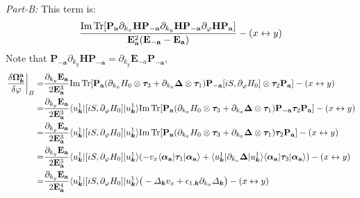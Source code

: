 \begin{subappendices}
\emph{Part-B:} This term is:
\begin{equation}
	\frac{\mbox{Im\,Tr}[\mathbf P_{\mathbf a} \partial_{k_x} \mathbf H \mathbf P_{-\mathbf a} \partial_{k_y}\mathbf H \mathbf P_{-\mathbf a}\partial_\varphi\mathbf H \mathbf P_{\mathbf a}]}{\mathbf E_{\mathbf a}^2(\mathbf E_{-\mathbf a}-\mathbf E_{\mathbf a})}-(x\leftrightarrow y)
\end{equation}
Note that $\mathbf P_{-\mathbf a} \partial_{k_y}\mathbf H \mathbf P_{-\mathbf a}=\partial_{k_y}\mathbf E_{\mathbf -a}\mathbf P_{-\mathbf a}$,
\begin{align}
	\left.\frac{\delta\boldsymbol\Omega^{\mathbf a}_{\bm{k}}}{\delta\varphi}\right|_{B}=&\frac{\partial_{k_y}\mathbf E_{\mathbf a}}{2\mathbf E_{\mathbf a}^3}\mbox{Im\,Tr}[\mathbf P_{\mathbf a} (\partial_{k_x}H_0\otimes\boldsymbol\tau_3+\partial_{k_x}\boldsymbol\Delta\otimes\boldsymbol\tau_1) \mathbf P_{-\mathbf a} [iS,\partial_\varphi H_0]\otimes\boldsymbol\tau_2 \mathbf P_{\mathbf a}]-(x\leftrightarrow y)\notag\\
	=&\frac{\partial_{k_y}\mathbf E_{\mathbf a}}{2\mathbf E_{\mathbf a}^3}\langle u^1_{\bm{k}}|[iS,\partial_\varphi H_0]|u^1_{\bm{k}}\rangle\mbox{Im\,Tr}[\mathbf P_{\mathbf a} (\partial_{k_x}H_0\otimes\boldsymbol\tau_3+\partial_{k_x}\boldsymbol\Delta\otimes\boldsymbol\tau_1) \mathbf P_{-\mathbf a}\boldsymbol\tau_2 \mathbf P_{\mathbf a}]  -(x\leftrightarrow y)\notag\\
	=&\frac{\partial_{k_y}\mathbf E_{\mathbf a}}{2\mathbf E_{\mathbf a}^3}\langle u^1_{\bm{k}}|[iS,\partial_\varphi H_0]|u^1_{\bm{k}}\rangle\mbox{Im\,Tr}[\mathbf P_{\mathbf a} (\partial_{k_x}H_0\otimes\boldsymbol\tau_3+\partial_{k_x}\boldsymbol\Delta\otimes\boldsymbol\tau_1) \boldsymbol\tau_2 \mathbf P_{\mathbf a}]  -(x\leftrightarrow y)\notag\\
	=&\frac{\partial_{k_y}\mathbf E_{\mathbf a}}{2\mathbf E_{\mathbf a}^3}\langle u^1_{\bm{k}}|[iS,\partial_\varphi H_0]|u^1_{\bm{k}}\rangle (-v_x\langle\boldsymbol\alpha_{\mathbf a}|\boldsymbol\tau_1| \boldsymbol\alpha_{\mathbf a}\rangle + \langle u^1_{\bm{k}}|\partial_{k_x}\boldsymbol\Delta|u^1_{\bm{k}}\rangle \langle\boldsymbol\alpha_{\mathbf a}|\boldsymbol\tau_3| \boldsymbol\alpha_{\mathbf a}\rangle ) -(x\leftrightarrow y)\notag\\
	=&\frac{\partial_{k_y}\mathbf E_{\mathbf a}}{2\mathbf E_{\mathbf a}^4}\langle u^1_{\bm{k}}|[iS,\partial_\varphi H_0]|u^1_{\bm{k}}\rangle \big(-\varDelta_{\bm{k}} v_x+\epsilon_{1,\bm{k}}\partial_{k_x}\varDelta_{\bm{k}}\big) -(x\leftrightarrow y)\notag\\

\end{align}
\end{subappendices}
